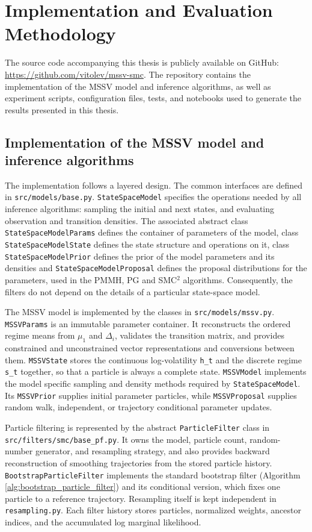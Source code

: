 \chapter{Implementation and Evaluation Methodology}

The source code accompanying this thesis is publicly available on GitHub:
\url{https://github.com/vitolev/mssv-smc}.
The repository contains the implementation of the MSSV model and inference
algorithms, as well as experiment scripts, configuration files, tests, and notebooks used
to generate the results presented in this thesis.

\section{Implementation of the MSSV model and inference algorithms}

The implementation follows a layered design.  The common interfaces are defined in
\texttt{src/models/base.py}.  \texttt{StateSpaceModel} specifies the operations
needed by all inference algorithms: sampling the initial and next states, and
evaluating observation and transition densities. The associated abstract class
\texttt{StateSpaceModelParams} defines the container of parameters of the model, class
\texttt{StateSpaceModelState} defines the state structure and operations on it, class
\texttt{StateSpaceModelPrior} defines the prior of the model parameters and its densities
and \texttt{StateSpaceModelProposal} defines the proposal distributions for the parameters, used in the PMMH, PG and SMC$^2$ algorithms.
Consequently, the filters do not depend on the details of a particular state-space model.

The MSSV model is implemented by the classes in
\texttt{src/models/mssv.py}.  \texttt{MSSVParams} is an immutable parameter
container.  It reconstructs the ordered regime means from
$\mu_1$ and $\Delta_i$, validates the transition matrix, and provides
constrained and unconstrained vector representations and conversions between them.
\texttt{MSSVState} stores the continuous log-volatility
\texttt{h\_t} and the discrete regime \texttt{s\_t} together, so that a particle
is always a complete state.  \texttt{MSSVModel} implements the model specific
sampling and density methods required by \texttt{StateSpaceModel}.  Its
\texttt{MSSVPrior} supplies initial parameter particles, while
\texttt{MSSVProposal} supplies random walk, independent, or trajectory
conditional parameter updates.

Particle filtering is represented by the abstract
\texttt{ParticleFilter} class in \texttt{src/filters/smc/base\_pf.py}.  It owns
the model, particle count, random-number generator, and resampling strategy,
and also provides backward reconstruction of smoothing trajectories from the
stored particle history.  \texttt{BootstrapParticleFilter} implements the
standard bootstrap filter (Algorithm \ref{alg:bootstrap_particle_filter}) and its conditional version,
which fixes one particle to a reference trajectory.  
Resampling itself is kept independent in
\texttt{resampling.py}.  Each
filter history stores particles, normalized weights, ancestor indices, and the
accumulated log marginal likelihood.

